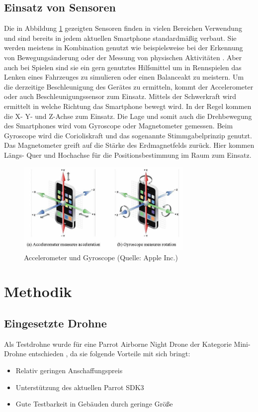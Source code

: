 \documentclass{article}
\begin{document}
\subsection{Einsatz von Sensoren}
Die in Abbildung \ref{fig:gyro} gezeigten Sensoren finden in vielen Bereichen Verwendung und sind bereits in jedem aktuellen Smartphone standardmäßig verbaut. 
Sie werden meistens in Kombination genutzt wie beispielsweise bei der Erkennung von Bewegungsänderung oder der Messung von physischen Aktivitäten \cite{wu2012classification}. Aber auch bei Spielen sind sie ein gern genutztes Hilfsmittel um in Rennspielen das Lenken eines Fahrzeuges zu simulieren oder einen Balanceakt zu meistern. 
Um die derzeitige Beschleunigung des Gerätes zu ermitteln, kommt der Accelerometer oder auch Beschleunigungssensor zum Einsatz. Mittels der Schwerkraft wird ermittelt in welche Richtung das Smartphone bewegt wird. In der Regel kommen die X- Y- und Z-Achse zum Einsatz. Die Lage und somit auch die Drehbewegung des Smartphones wird vom Gyroscope oder Magnetometer gemessen. Beim Gyroscope wird die Corioliskraft und das sogenannte Stimmgabelprinzip genutzt. Das Magnetometer greift auf die Stärke des Erdmagnetfelds zurück. Hier kommen Längs- Quer und Hochachse für die Positionsbestimmung im Raum zum Einsatz.
\begin{figure}
\begin{minipage}[b]{1.0\linewidth}
  \centering
\centerline{\includegraphics[width= 85mm]{gyro.jpg}}
\end{minipage}
\caption{Accelerometer und Gyroscope (Quelle: Apple Inc.)}
\label{fig:gyro}
\end{figure}

\section{Methodik}

\subsection{Eingesetzte Drohne}
Als Testdrohne wurde für eine Parrot Airborne Night Drone der Kategorie Mini-Drohne entschieden \cite{minidrone}, da sie folgende Vorteile mit sich bringt: 
\begin{itemize}
	\item Relativ geringen Anschaffungspreis
	\item Unterstützung des aktuellen Parrot SDK3
	\item Gute Testbarkeit in Gebäuden durch geringe Größe 
\end{itemize}
\end{document}
